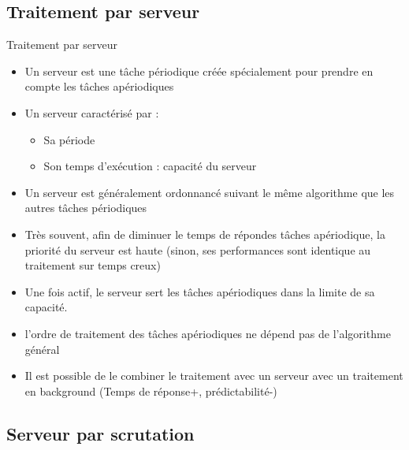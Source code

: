 \subsection{Traitement par serveur}

\begin{frame}{Traitement par serveur} 
  \begin{itemize}
  \item Un  serveur est une  tâche périodique créée  spécialement pour
    prendre en compte les tâches apériodiques
  \item Un serveur caractérisé par :
    \begin{itemize}
    \item Sa période 
    \item Son temps d'exécution : capacité du serveur  
    \end{itemize}
  \item Un serveur est généralement ordonnancé suivant  le même algorithme
    que les autres tâches périodiques
  \item Très  souvent, afin  de diminuer le  temps de  répondes tâches
    apériodique,  la  priorité  du   serveur  est  haute  (sinon,  ses
    performances sont identique au traitement sur temps creux)
  \item Une fois actif, le serveur sert les tâches apériodiques dans
    la limite de sa capacité.
  \item l'ordre de traitement  des tâches apériodiques ne dépend pas
    de l'algorithme général
  \item Il est  possible de le combiner le  traitement avec un serveur
    avec   un   traitement   en   background   (Temps   de   réponse+,
    prédictabilité-)
  \end{itemize}
\end{frame}

\subsection{Serveur par scrutation}

